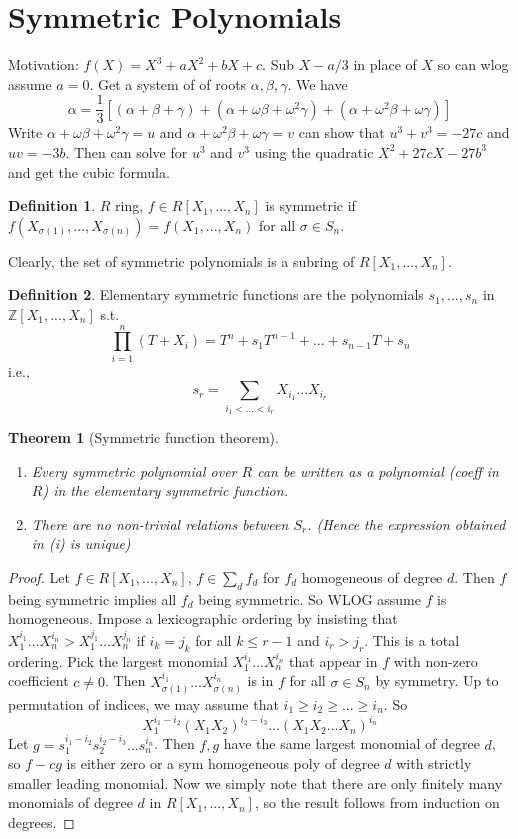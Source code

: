 \documentclass{article}
\theoremstyle{definition}
\newtheorem*{defn*}{Definition}
\theoremstyle{remark}
\theoremstyle{plain}
\newtheorem{thm}[defn]{Theorem}
\newcommand{\ZZ}{\mathbb{Z}}
\begin{document}
\section{Symmetric Polynomials}
Motivation: $f(X)=X^3+aX^2+bX+c$. Sub $X-a/3$ in place of $X$ so can wlog assume $a=0$. Get a system of of roots $\alpha,\beta,\gamma$. We have
\[\alpha=\dfrac{1}{3}[(\alpha+\beta+\gamma)+(\alpha+\omega\beta+\omega^2\gamma)+(\alpha+\omega^2\beta+\omega\gamma)]\]
Write $\alpha+\omega\beta+\omega^2\gamma=u$ and $\alpha+\omega^2\beta+\omega\gamma=v$ can show that $u^3+v^3=-27c$ and $uv=-3b$. Then can solve for $u^3$ and $v^3$ using the quadratic $X^2+27cX-27b^3$ and get the cubic formula.

\begin{defn*}
    $R$ ring, $f\in R[X_1,...,X_n]$ is symmetric if $f(X_{\sigma(1)},...,X_{\sigma(n)})=f(X_1,...,X_n)$ for all $\sigma\in S_n$.
\end{defn*}
Clearly, the set of symmetric polynomials is a subring of $R[X_1,...,X_n]$.
\begin{defn*}
    Elementary symmetric functions are the polynomials $s_1,...,s_n$ in $\ZZ[X_1,...,X_n]$ s.t.
    \[\prod_{i=1}^n(T+X_i)=T^n+s_1T^{n-1}+...+s_{n-1}T+s_n\]
    i.e.,
    \[s_r=\sum_{i_1<...<i_r}X_{i_1}...X_{i_r}\]
\end{defn*}
\begin{thm}[Symmetric function theorem]
    \begin{enumerate}
        \item Every symmetric polynomial over $R$ can be written as a polynomial (coeff in $R$) in the elementary symmetric function.
        \item There are no non-trivial relations between $S_r$. (Hence the expression obtained in (i) is unique)
    \end{enumerate}
\end{thm}
\begin{proof}
    Let $f\in R[X_1,...,X_n]$, $f\in\sum_df_d$ for $f_d$ homogeneous of degree $d$. Then $f$ being symmetric implies all $f_d$ being symmetric. So WLOG assume $f$ is homogeneous. Impose a lexicographic ordering by insisting that $X_1^{i_1}...X_n^{i_n}>X_1^{j_1}...X_n^{j_n}$ if $i_k=j_k$ for all $k\le r-1$ and $i_r>j_r$. This is a total ordering. Pick the largest monomial $X_{1}^{i_1}...X_n^{i_n}$ that appear in $f$ with non-zero coefficient $c\neq 0$. Then $X_{\sigma(1)}^{i_1}...X_{\sigma(n)}^{i_n}$ is in $f$ for all $\sigma\in S_n$ by symmetry. Up to permutation of indices, we may assume that $i_1\ge i_2\ge...\ge i_n$. So
    \[X_1^{i_1-i_2}(X_1X_2)^{i_2-i_3}...(X_1X_2...X_n)^{i_n}\]
    Let $g=s_1^{i_1-i_2}s_2^{i_2-i_3}...s_n^{i_n}$. Then $f,g$ have the same largest monomial of degree $d$, so $f-cg$ is either zero or a sym homogeneous poly of degree $d$ with strictly smaller leading monomial. Now we simply note that there are only finitely many monomials of degree $d$ in $R[X_1,...,X_n]$, so the result follows from induction on degrees.
\end{proof}
\end{document}
